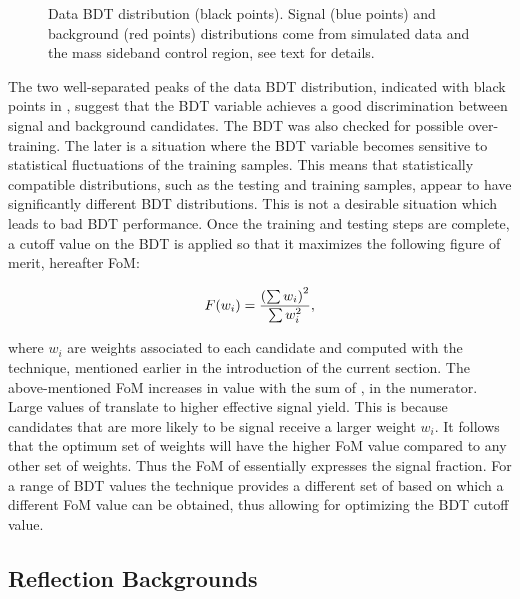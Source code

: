 \begin{figure}[!t]
\centering
  \scalebox{1}{}
  \caption{Data BDT distribution (black points). Signal (blue points) and background (red points) distributions
           come from simulated data and the \Bs mass sideband control region, see text for details.}
  \label{BTDG_performance}
\end{figure}

The two well-separated peaks of the data BDT distribution, indicated with black points in , suggest
that the BDT variable achieves a good discrimination between signal and background candidates.
The BDT was also checked for possible over-training. The later is a situation where the BDT variable becomes sensitive
to statistical fluctuations of the training samples. This means that statistically compatible distributions, such as
the testing and training samples, appear to have significantly different BDT distributions. This is not a desirable
situation which leads to bad BDT performance. Once the training and testing steps are complete, a cutoff value on the
BDT is applied so that it maximizes the following figure of merit, hereafter FoM:

\begin{equation}
  \centering
  F(w_i) = \frac{\left(\sum{w_{i}}\right)^2}{\sum{w_{i}^2}},
\label{eqn:fom}
\end{equation}

\noindent where $w_i$ are weights associated to each candidate and computed with the \sPlot technique,
mentioned earlier in the introduction of the current section. The above-mentioned FoM increases in value with
the sum of \sWeights, in the numerator. Large values of \sWeights translate to higher effective signal yield.
This is because candidates that are more likely to be signal receive a larger weight $w_i$. It follows that the
optimum set of weights will have the higher FoM value compared to any other set of weights. Thus the FoM
of  essentially expresses the signal fraction. For a range of BDT values the \sPlot technique
provides a different set of \sWeights based on which a different FoM value can be obtained, thus allowing for
optimizing the BDT cutoff value.

\subsection{Reflection Backgrounds}
\label{peaking_backgrounds}


